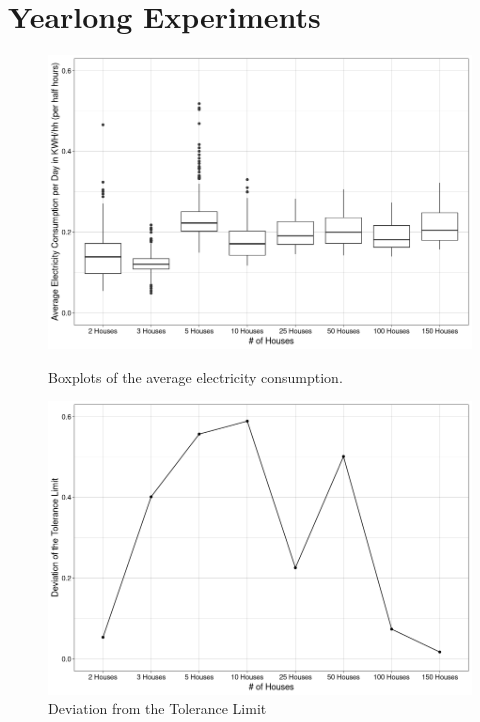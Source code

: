 \chapter{Yearlong Experiments}
\enlargethispage{10}
\vspace*{-10\baseline}
\begin{figure}[H]
\centering
\includegraphics[width=0.8\columnwidth]{images/boxplot_neu_neu.png}
\caption[Boxplots of the Average Base Load]{Boxplots of the average electricity consumption.}
\label{img:Box}
\centering
\includegraphics[width=0.8\columnwidth]{images/Deviation_Houses.png}
\caption[Deviation of the Standard Variance]{Deviation from the Tolerance Limit}
\label{img:Deviation}
\end{figure}
\nopagebreak
